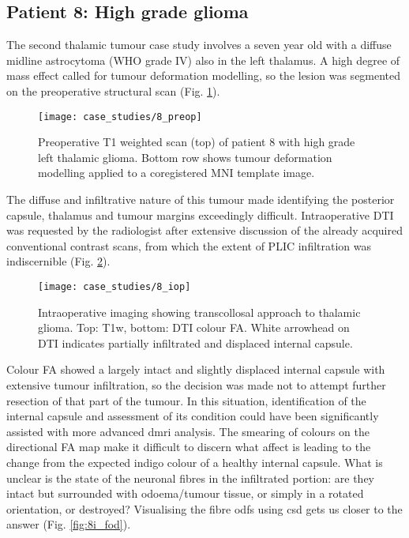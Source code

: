 \subsection{Patient 8: High grade glioma}

The second thalamic tumour case study involves a seven year old with a diffuse midline astrocytoma (WHO grade IV) also in the left thalamus.
A high degree of mass effect called for tumour deformation modelling, so the lesion was segmented on the preoperative structural scan (Fig. \ref{fig:8p}).

\begin{figure}
  \centering
  \texttt{[image: case\_studies/8\_preop]}
  \caption{Preoperative T1 weighted scan (top) of patient 8 with high grade left thalamic glioma. Bottom row shows tumour deformation modelling applied to a coregistered MNI template image.}
  \label{fig:8p}
\end{figure}

The diffuse and infiltrative nature of this tumour made identifying the posterior capsule, thalamus and tumour margins exceedingly difficult.
Intraoperative DTI was requested by the radiologist after extensive discussion of the already acquired conventional contrast scans, from which the extent of PLIC infiltration was indiscernible (Fig. \ref{fig:8i}).

\begin{figure}
  \centering
  \texttt{[image: case\_studies/8\_iop]}
  \caption{Intraoperative imaging showing transcollosal approach to thalamic glioma. Top: T1w, bottom: DTI colour FA. White arrowhead on DTI indicates partially infiltrated and displaced internal capsule.}
  \label{fig:8i}
\end{figure}

Colour FA showed a largely intact and slightly displaced internal capsule with extensive tumour infiltration, so the decision was made not to attempt further resection of that part of the tumour.
In this situation, identification of the internal capsule and assessment of its condition could have been significantly assisted with more advanced \gls{dmri} analysis.
The smearing of colours on the directional FA map make it difficult to discern what affect is leading to the change from the expected indigo colour of a healthy internal capsule.
What is unclear is the state of the neuronal fibres in the infiltrated portion: are they intact but surrounded with odoema/tumour tissue, or simply in a rotated orientation, or destroyed?
Visualising the fibre \glspl{odf} using \gls{csd} gets us closer to the answer (Fig. \ref{fig:8i_fod}).

